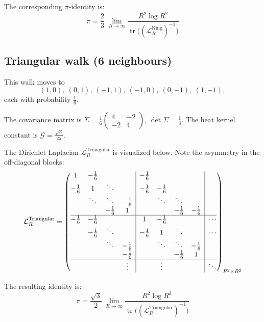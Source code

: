 \documentclass[reqno]{amsart}
\numberwithin{equation}{section}
\theoremstyle{definition}
\theoremstyle{remark}
\newcommand{\cG}{\mathcal{G}}
\DeclareMathOperator{\tr}{tr}
\begin{document}
The corresponding $\pi$-identity is:
\begin{equation}\label{eq:King_pi}
\boxed{\;\displaystyle \pi=\frac{2}{3}\;\lim_{R\to\infty}\frac{R^{2}\log R^{2}}{\tr\!\bigl((\mathcal{L}_R^{\text{King}})^{-1}\bigr)}\;}
\end{equation}

\subsection{Triangular walk (6 neighbours)}\label{app:tri}

This walk moves to
\[
(1,0),\ (0,1),\ (-1,1),\ (-1,0),\ (0,-1),\ (1,-1),
\]
each with probability $\tfrac16$.

The covariance matrix is $\Sigma=\frac{1}{6}\left(\begin{smallmatrix}4&-2\\-2&4\end{smallmatrix}\right)$, $\det\Sigma = \frac{1}{3}$. The heat kernel constant is $\cG = \frac{\sqrt{3}}{2\pi}$.

The Dirichlet Laplacian $\mathcal{L}_R^{\text{Triangular}}$ is visualized below. Note the asymmetry in the off-diagonal blocks:
\[
\mathcal{L}_R^{\text{Triangular}} =
\left(\begin{array}{@{}cccc|cccc|c@{}}
1 & -\frac{1}{6} & & & -\frac{1}{6} & & & & \\
-\frac{1}{6} & 1 & \ddots & & -\frac{1}{6} & -\frac{1}{6} & & & \\
& \ddots & \ddots & -\frac{1}{6} & & \ddots & \ddots & & \\
& & -\frac{1}{6} & 1 & & & -\frac{1}{6} & -\frac{1}{6} & \\
\hline
-\frac{1}{6} & -\frac{1}{6} & & & 1 & -\frac{1}{6} & & & \cdots \\
& -\frac{1}{6} & \ddots & & -\frac{1}{6} & 1 & \ddots & & \cdots \\
& & \ddots & -\frac{1}{6} & & \ddots & \ddots & -\frac{1}{6} & \\
& & & -\frac{1}{6} & & & -\frac{1}{6} & 1 & \\
\hline
& & & \vdots & & \vdots & & & \ddots
\end{array}\right)_{R^2 \times R^2}
\]

The resulting identity is:
\begin{equation}\label{eq:Tri_pi}
\boxed{\;\displaystyle \pi=\frac{\sqrt{3}}{2}\;\lim_{R\to\infty}\frac{R^{2}\log R^{2}}{\tr\!\bigl((\mathcal{L}_R^{\text{Triangular}})^{-1}\bigr)}\;}
\end{equation}
\end{document}
